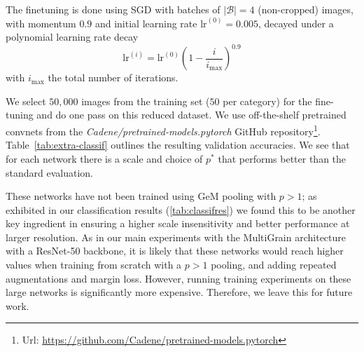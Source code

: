 The finetuning is done using SGD with batches of $|\mathcal{B}| = 4$ (non-cropped) images, with momentum $0.9$ and initial learning rate $\text{lr}^{(0)} = 0.005$, decayed under a polynomial learning rate decay
\begin{equation}
    \text{lr}^{(i)} = \text{lr}^{(0)} \left( 1 - \frac{i}{i_\text{max}} \right)^{0.9}
\end{equation}
with $i_\text{max}$ the total number of iterations.

We select $50,000$ images from the training set ($50$ per category) for the fine-tuning and do one pass on this reduced dataset. We use off-the-shelf pretrained convnets from the \emph{Cadene/pretrained-models.pytorch} GitHub repository\footnote{Url: \url{https://github.com/Cadene/pretrained-models.pytorch}}. 
Table~\ref{tab:extra-classif} outlines the resulting validation accuracies. 
We see that for each network there is a scale and choice of $p^*$ that performs better than the standard evaluation. 

These networks have not been trained using GeM pooling with $p>1$; as exhibited in our classification results (\cref{tab:classifres}) we found this to be another key ingredient in ensuring a higher scale insensitivity and better performance at larger resolution. 
As in our main experiments with the MultiGrain architecture with a ResNet-50 backbone,
it is likely that these networks would reach higher values when training from scratch with a $p>1$ pooling, and adding repeated augmentations and margin loss.
However, running training experiments on these large networks is significantly more expensive. 
Therefore, we leave this for future work.
 
%

%
%
%




\FloatBarrier
{\small{}}



